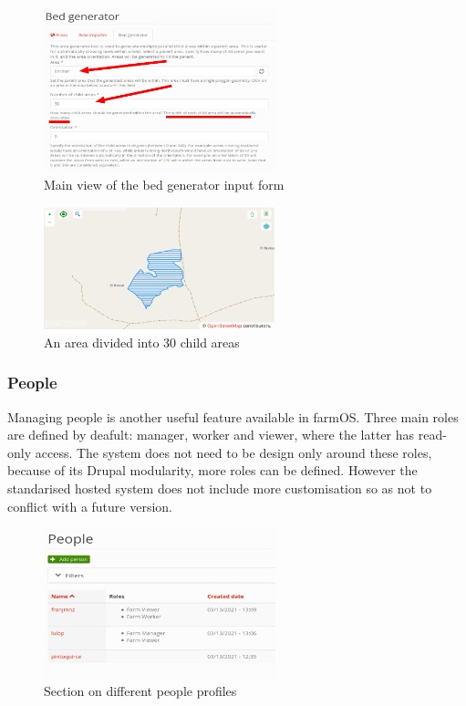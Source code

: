\begin{figure}[htp]
    \centering
    \includegraphics[width=0.60\textwidth]{fig/bed_gen.png}
    \caption{Main view of the bed generator input form}
    \label{fig:bed_gen}
\end{figure}

\begin{figure}[htp]
    \centering
    \includegraphics[width=0.60\textwidth]{fig/bed_gen_example.png}
    \caption{An area divided into 30 child areas}
    \label{fig:bed_gen}
\end{figure}


\subsubsection{People}
Managing people is another useful feature available in farmOS. Three main roles are defined by deafult: manager, worker and viewer,  where the latter has read-only access. The system does not need to be design only around these roles, because of its Drupal modularity, more roles can be defined. However the standarised hosted system does not include more customisation so as not to conflict with a future version.


\begin{figure}[htp]
    \centering
    \includegraphics[width=0.6\textwidth]{fig/people.png}
    \caption{Section on different people profiles}
    \label{fig:people}
\end{figure}

